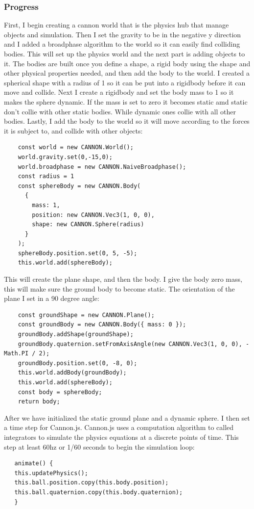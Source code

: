 \documentclass[onecolumn, draftclsnofoot,10pt, compsoc]{IEEEtran}
\begin{document}
   \subsubsection{Progress}
   First, I begin creating a cannon world that is the physics hub that manage objects and simulation. Then I set the gravity to be in the negative y direction and I added a broadphase algorithm to the world so it can easily find colliding bodies. This will set up the physics world and the next part is adding objects to it. The bodies are built once you define a shape, a rigid body using the shape and other physical properties needed, and then add the body to the world. I created a spherical shape with a radius of 1 so it can be put into a rigidbody before it can move and collide. Next I create a rigidbody and set the body mass to 1 so it makes the sphere dynamic. If the mass is set to zero it becomes static amd static don't collie with other static bodies. While dynamic ones collie with all other bodies. Lastly, I add the body to the world so it will move according to the forces it is subject to, and collide with other objects:
   
   \begin{lstlisting}
    const world = new CANNON.World();
    world.gravity.set(0,-15,0);
    world.broadphase = new CANNON.NaiveBroadphase();
    const radius = 1
    const sphereBody = new CANNON.Body(
      {
        mass: 1,
        position: new CANNON.Vec3(1, 0, 0),
        shape: new CANNON.Sphere(radius)
      }
    );
    sphereBody.position.set(0, 5, -5);
    this.world.add(sphereBody);
   \end{lstlisting}
   
   This will create the plane shape, and then the body. I give the body zero mass, this will make sure the ground body to become static. The orientation of the plane I set in a 90 degree angle: 
   
   \begin{lstlisting}
    const groundShape = new CANNON.Plane();
    const groundBody = new CANNON.Body({ mass: 0 });
    groundBody.addShape(groundShape);
    groundBody.quaternion.setFromAxisAngle(new CANNON.Vec3(1, 0, 0), -Math.PI / 2);
    groundBody.position.set(0, -8, 0);
    this.world.addBody(groundBody);
    this.world.add(sphereBody);
    const body = sphereBody;
    return body;
   \end{lstlisting}
    
    After we have initialized the static ground plane and a dynamic sphere. I then set a time step for Cannon.js. Cannon.js uses a computation algorithm to called integrators to simulate the physics equations at a discrete points of time. This step at least 60hz or 1/60 seconds to begin the simulation loop:
   \begin{lstlisting}
   animate() {
   this.updatePhysics();
   this.ball.position.copy(this.body.position);
   this.ball.quaternion.copy(this.body.quaternion);
   }
   \end{lstlisting} 
   
\end{document}
